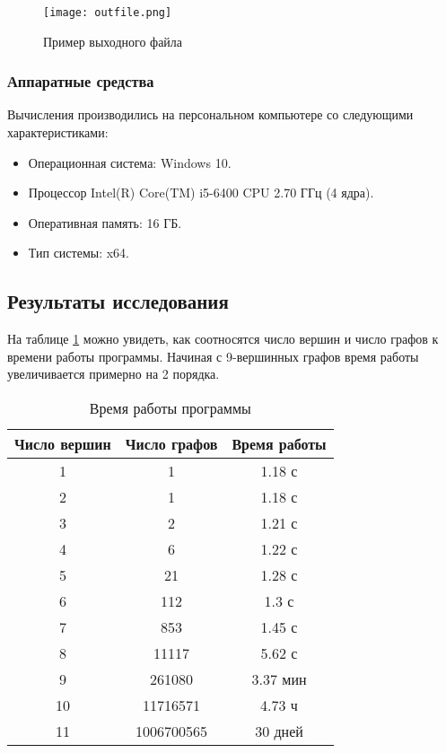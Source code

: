 \documentclass[bachelor, och, nir]{SCWorks}
\begin{document}
\begin{figure}[H]
    \centering
    \texttt{[image: outfile.png]}
    \caption{Пример выходного файла}
    \label{img:outfile}
\end{figure}

\subsubsection{Аппаратные средства}
Вычисления производились на персональном компьютере со следующими характеристиками:
\begin{itemize}
    \item Операционная система: Windows 10.
    \item Процессор Intel(R) Core(TM) i5-6400 CPU 2.70 ГГц (4 ядра).
    \item Оперативная память: 16 ГБ.
    \item Тип системы: x64.
\end{itemize}


\subsection{Результаты исследования}
На таблице \ref{tab:time} можно увидеть, как соотносятся число вершин и число графов к времени работы программы.
Начиная с 9-вершинных графов время работы увеличивается примерно на 2 порядка.

\begin{table}[H]
    \begin{tabular}{|c|c|c|}
    \hline
    Число вершин & Число графов & Время работы \\ \hline
    1  & 1 & 1.18 с \\ \hline
    2  & 1 & 1.18 с \\ \hline
    3  & 2 & 1.21 с \\ \hline
    4  & 6 & 1.22 с \\ \hline
    5  & 21 & 1.28 с\\ \hline
    6  & 112 & 1.3 с \\ \hline
    7  & 853 & 1.45 с \\ \hline
    8  & 11117 & 5.62 с \\ \hline
    9  & 261080 & 3.37 мин \\ \hline
    10 & 11716571 & 4.73 ч \\ \hline
    11 & 1006700565 & 30 дней \\ \hline
    \end{tabular}
    \caption{Время работы программы}
    \label{tab:time}
\end{table}
\end{document}
